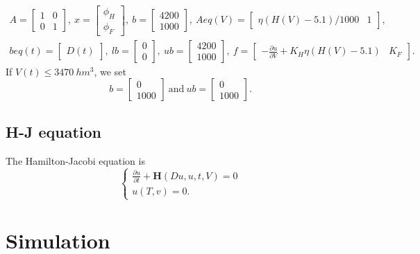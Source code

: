 \documentclass[12pt]{article}
\theoremstyle{definition}
\theoremstyle{remark}
\begin{document}
\begin{multline*}
A=\begin{bmatrix}
1 & 0 \\
0 & 1 
\end{bmatrix},\ 
x=\begin{bmatrix}
\phi_H \\
\phi_F
\end{bmatrix},\ 
b=\begin{bmatrix}
4200 \\
1000
\end{bmatrix},\ 
Aeq(V)=\begin{bmatrix}
\eta(H(V)-5.1)/1000 & 1
\end{bmatrix},\\
beq(t)=\begin{bmatrix}
D(t)
\end{bmatrix},\ 
lb=\begin{bmatrix}
0 \\
0
\end{bmatrix},\
ub=\begin{bmatrix}
4200 \\
1000
\end{bmatrix},\ 
f=\begin{bmatrix}
-\frac{\partial u}{\partial V}+K_H\eta(H(V)-5.1) & K_F
\end{bmatrix}.
\end{multline*}
If $V(t)\leq3470\ hm^3$, we set
\begin{equation*}
b=\begin{bmatrix}
0 \\
1000
\end{bmatrix}\ \text{and}\ ub=\begin{bmatrix}
0 \\
1000
\end{bmatrix}.
\end{equation*}
\subsection{H-J equation}

The Hamilton-Jacobi equation is
\begin{equation*}
\begin{cases}
\frac{\partial u}{\partial t}+\mathbf{H}(Du,u,t,V)=0\\
u(T,v)=0.
\end{cases}
\end{equation*}

\section{Simulation}
\end{document}
